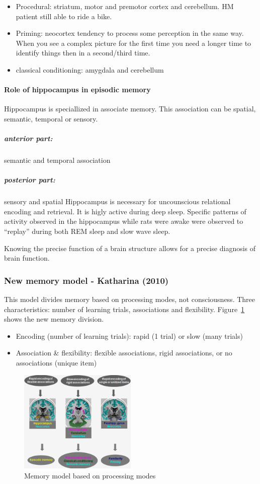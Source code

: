 \documentclass[12pt,article,oneside,a4paper]{memoir}
\begin{document}
\begin{itemize}
\item Procedural: striatum, motor and premotor cortex and cerebellum.
\subitem HM patient still able to ride a bike.
\item Priming: neocortex
\subitem tendency to process some perception in the same way. When you see a
complex picture for the first time you need a longer time to identify things
then in a second/third time.
\item classical conditioning: amygdala and cerebellum
\end{itemize}

\paragraph{Role of hippocampus in episodic memory} 

Hippocampus is speciallized in associate memory. This association can be
spatial, semantic, temporal or sensory.
\subparagraph{anterior part:} semantic and temporal association
\subparagraph{posterior part:} sensory and spatial
Hippocampus is necessary for uncounscious relational encoding and retrieval.
It is higly active during deep sleep. Specific patterns of activity observed in
the hippocampus while rats were awake were observed to “replay” during both REM
sleep and slow wave sleep.

Knowing the precise function of a brain structure allows for a precise
diagnosis of brain function.

\subsubsection{New memory model - Katharina (2010)}
This model divides memory based on processing modes, not consciousness.
Three characteristics: number of learning trials, associations and flexibility.
Figure~\ref{fig:new-memory-model} shows the new memory division.
\begin{itemize}
\item Encoding (number of learning trials): rapid (1 trial) or slow (many
trials)
\item Association \& flexibility: flexible associations, rigid associations, or
no associations (unique item)
\end{itemize}

\begin{figure}[h]
  \centering
  \includegraphics[width=0.5\textwidth]{imgs/new-memory-model.png}
  \caption{Memory model based on processing modes}
  \label{fig:new-memory-model}
\end{figure}
\end{document}
